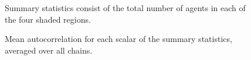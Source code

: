 \documentclass{article}
\begin{document}
\begin{figure}
	\centering
	\caption{Summary statistics consist of the total number of agents in each of the four shaded regions.}
	\label{figRegions}
\end{figure}

\begin{figure}
	\centering
	\caption{Mean autocorrelation for each scalar of the summary statistics, averaged over all chains.}
	\label{figAutocorrelation}
\end{figure}
\end{document}
